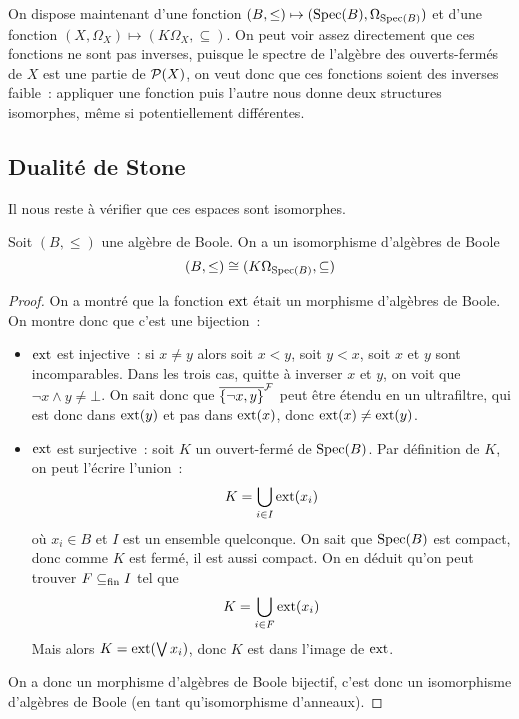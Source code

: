 On dispose maintenant d'une fonction
$(B,\leq) \mapsto (\operatorname{Spec}(B),\Omega_{\operatorname{Spec}(B)})$ et d'une fonction
$(X,\Omega_X)\mapsto (K\Omega_X,\subseteq)$. On peut voir assez directement
que ces fonctions ne sont pas inverses, puisque le spectre de l'algèbre des
ouverts-fermés de $X$ est une partie de $\mathcal{P}(X)$, on veut donc que ces
fonctions soient des inverses \og faible\fg~: appliquer une fonction puis
l'autre nous donne deux structures isomorphes, même si potentiellement
différentes.

\subsection{Dualité de Stone}

Il nous reste à vérifier que ces espaces sont isomorphes.

\begin{lemma}
  Soit $(B,\leq)$ une algèbre de Boole. On a un isomorphisme d'algèbres de Boole
  \[(B,\leq) \cong (K\Omega_{\operatorname{Spec}(B)},\subseteq)\]
\end{lemma}

\begin{proof}
  On a montré que la fonction $\operatorname{ext}$ était un morphisme d'algèbres de Boole.
  On montre donc que c'est une bijection~:
  \begin{itemize}
  \item $\operatorname{ext}$ est injective~: si $x\neq y$ alors soit $x < y$, soit
    $y < x$, soit $x$ et $y$ sont incomparables. Dans les trois cas,
    quitte à inverser $x$ et $y$, on voit que $\lnot x \land y \neq \bot$. On
    sait donc que $\overline{\{\lnot x,y\}}^{\mathcal F}$ peut être étendu en un ultrafiltre,
    qui est donc dans $\operatorname{ext}(y)$ et pas dans $\operatorname{ext}(x)$, donc
    $\operatorname{ext}(x)\neq\operatorname{ext}(y)$.
  \item $\operatorname{ext}$ est surjective~: soit $K$ un ouvert-fermé de $\operatorname{Spec}(B)$. Par
    définition de $K$, on peut l'écrire l'union~:
    \[K = \bigcup_{i \in I} \operatorname{ext}(x_i)\]
    où $x_i \in B$ et $I$ est un ensemble quelconque. On sait que $\operatorname{Spec}(B)$
    est compact, donc comme $K$ est fermé, il est aussi compact. On en déduit
    qu'on peut trouver $F\subseteq_{\mathrm{fin}} I$ tel que
    \[K = \bigcup_{i \in F} \operatorname{ext}(x_i)\]
    Mais alors $K = \operatorname{ext}(\bigvee x_i)$, donc $K$ est dans l'image de $\operatorname{ext}$.
  \end{itemize}

  On a donc un morphisme d'algèbres de Boole bijectif, c'est donc un
  isomorphisme d'algèbres de Boole (en tant qu'isomorphisme d'anneaux).
\end{proof}

